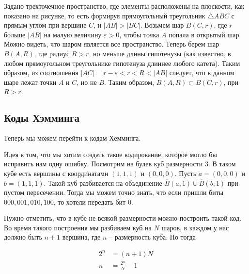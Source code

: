 \documentclass[../functional-analysis_17-18.tex]{subfiles}
\begin{document}
	Задано трехточечное пространство, где элементы расположены на плоскости, как показано на рисунке, то есть формируя прямоугольный треугольник $\triangle ABC$ с прямым углом при вершине $C$, и $|AB|>|BC|$. Возьмем шар $B(C, r)$, где $r$ больше $|AB|$ на малую величину $\varepsilon>0$, чтобы точка $A$ попала в открытый шар. Можно видеть, что шаром является все пространство. Теперь берем шар $B(A, R)$, где радиус $R>r$, но меньше длины гипотенузы (как известно, в любом прямоугольном треугольнике гипотенуза длиннее любого катета). Таким образом, из соотношения $|AC|=r-\varepsilon<r<R<|AB|$ следует, что в данном шаре лежат точки $A$ и $C$, но не $B$. 
	Таким образом, $B(A, R)\subset B(C, r)$, при  $R>r$.
	
	\subsection{Коды Хэмминга}
	Теперь мы можем перейти к кодам Хемминга.
	
%		
%		
	Идея в том, что мы хотим создать такое кодирование, которое могло бы исправить нам одну ошибку. Посмотрим на булев куб размерности 3. В таком кубе есть вершины с координатами $(1, 1, 1)$ и $(0, 0, 0)$. Пусть $a = (0, 0, 0)$ и $b = (1, 1, 1)$. Такой куб разбивается на объединение $\overline{B}(a, 1) \cup \overline{B}(b, 1)$ при пустом пересечении. Тогда мы можем точно знать, что если пришли биты $000, 001, 010, 100$, то хотели передать бит $0$.  
	
	Нужно отметить, что в кубе не всякой размерности можно построить такой код. Во время такого построения мы разбиваем куб на $N$ шаров, в каждом у нас должно быть $n + 1$ вершина, где $n$ -- размерность куба. Но тогда
	
	\begin{equation}
		\begin{aligned}
			2^n &= (n + 1)N \\
			n &= \frac{2^n}{N} - 1
		\end{aligned}
	\end{equation}
	
\end{document}

